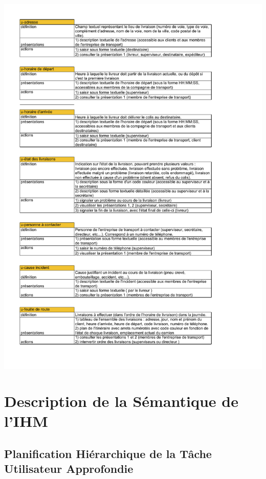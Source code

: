 \documentclass{report}
\begin{document}
\paragraph{}

\includegraphics[scale = 0.8, page = 2]{images/DPOU.pdf}


\chapter{Description de la Sémantique de l'IHM}


\section{Planification Hiérarchique de la Tâche Utilisateur Approfondie}
\end{document}
